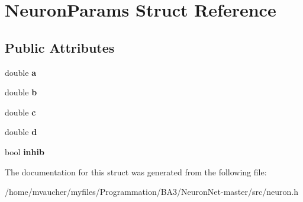 \hypertarget{structNeuronParams}{}\section{Neuron\+Params Struct Reference}
\label{structNeuronParams}
\subsection*{Public Attributes}
\begin{DoxyCompactItemize}
\item 
\mbox{\label{structNeuronParams_a359703733f5e70bbd67d019e45a3bc85}} 
double {\bfseries a}
\item 
\mbox{\label{structNeuronParams_abd1bd37179d8efa115a8749f9252f77d}} 
double {\bfseries b}
\item 
\mbox{\label{structNeuronParams_a5df2ced2526eb84af2c8d2d34d9bfd93}} 
double {\bfseries c}
\item 
\mbox{\label{structNeuronParams_af2bd3bad3bc5532186cdc8d056a10cfb}} 
double {\bfseries d}
\item 
\mbox{\label{structNeuronParams_a751856d77a821cbd361b774d8653bbe6}} 
bool {\bfseries inhib}
\end{DoxyCompactItemize}


The documentation for this struct was generated from the following file\+:\begin{DoxyCompactItemize}
\item 
/home/mvaucher/myfiles/\+Programmation/\+B\+A3/\+Neuron\+Net-\/master/src/neuron.\+h\end{DoxyCompactItemize}
